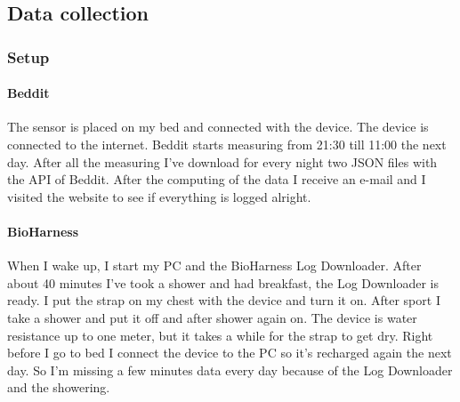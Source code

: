 	\subsection{Data collection}
		\subsubsection{Setup}
			\paragraph{Beddit}
				The sensor is placed on my bed and connected with the device. The device is connected to the internet. Beddit starts measuring from 21:30 till 11:00 the next day. After all the measuring I've download for every night two JSON files with the API of Beddit\cite{bedditapi}. After the computing of the data I receive an e-mail and I visited the website to see if everything is logged alright.
			\paragraph{BioHarness}
				When I wake up, I start my PC and the BioHarness Log Downloader. After about 40 minutes I've took a shower and had breakfast, the Log Downloader is ready. I put the strap on my chest with the device and turn it on. After sport I take a shower and put it off and after shower again on. The device is water resistance up to one meter, but it takes a while for the strap to get dry. Right before I go to bed I connect the device to the PC so it's recharged again the next day. So I'm missing a few minutes data every day because of the Log Downloader and the showering. 
